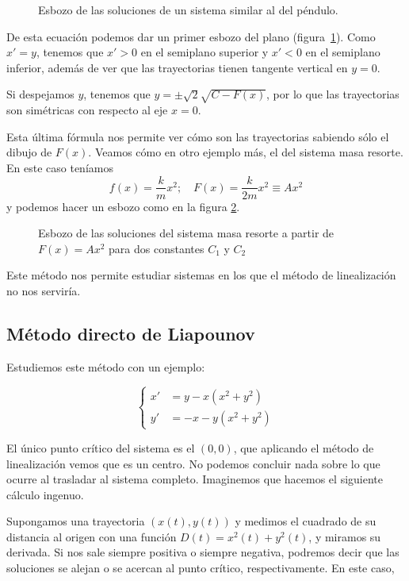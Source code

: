 \begin{figure}[hbtp]
\label{imgEsbozoSist}
\caption{Esbozo de las soluciones de un sistema similar al del péndulo.}
\end{figure}

De esta ecuación podemos dar un primer esbozo del plano (figura \ref{imgEsbozoSist}). Como $x'=y$, tenemos que $x'>0$ en el semiplano superior y $x'<0$ en el semiplano inferior, además de ver que las trayectorias tienen tangente vertical en $y = 0$.

Si despejamos $y$, tenemos que $y = \pm \sqrt{2}\sqrt{C-F(x)}$, por lo que las trayectorias son simétricas con respecto al eje $x = 0$. 

Esta última fórmula nos permite ver cómo son las trayectorias sabiendo sólo el dibujo de $F(x)$. Veamos cómo en otro ejemplo más, el del sistema masa resorte. En este caso teníamos \[ f(x) = \frac{k}{m}x^2;\quad F(x) = \frac{k}{2m}x^2 \equiv A x^2 \] y podemos hacer un esbozo como en la figura \ref{img8MasaResorte}.

\begin{figure}[hbtp]
\label{img8MasaResorte}
\caption{Esbozo de las soluciones del sistema masa resorte a partir de $F(x) = A x^2$ para dos constantes $C_1$ y $C_2$}
\end{figure}

Este método nos permite estudiar sistemas en los que el método de linealización no nos serviría. 

\subsection{Método directo de Liapounov}

Estudiemos este método con un ejemplo:

\[ \begin{cases} x' &= y-x(x^2+y^2) \\ y' &= -x -y(x^2+y^2) \end{cases} \]

El único punto crítico del sistema es el $(0,0)$, que aplicando el método de linealización vemos que es un centro. No podemos concluir nada sobre lo que ocurre al trasladar al sistema completo. Imaginemos que hacemos el siguiente cálculo ingenuo.

Supongamos una trayectoria $(x(t), y(t))$ y medimos el cuadrado de su distancia al origen con una función $D(t) = x^2(t) + y^2(t)$, y miramos su derivada. Si nos sale siempre positiva o siempre negativa, podremos decir que las soluciones se alejan o se acercan al punto crítico, respectivamente. En este caso, 

